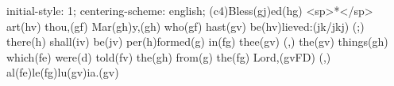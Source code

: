 initial-style: 1;
centering-scheme: english;
(c4)Bless(gj)ed(hg) <sp>*</sp> art(hv) thou,(gf) Mar(gh)y,(gh) who(gf) hast(gv) be(hv)lieved:(jk/jkj) (;) there(h) shall(iv) be(jv) per(h)formed(g) in(fg) thee(gv) (,) the(gv) things(gh) which(fe) were(d) told(fv) the(gh) from(g) the(fg) Lord,(gvFD) (,) al(fe)le(fg)lu(gv)ia.(gv)
